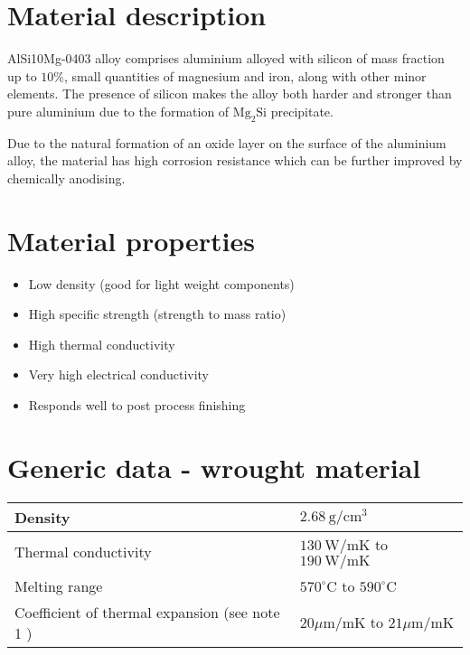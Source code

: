 \documentclass[10pt]{article}
\begin{document}
\section*{Material description}
AlSi10Mg-0403 alloy comprises aluminium alloyed with silicon of mass fraction up to $10 \%$, small quantities of magnesium and iron, along with other minor elements. The presence of silicon makes the alloy both harder and stronger than pure aluminium due to the formation of $\mathrm{Mg}_{2} \mathrm{Si}$ precipitate.

Due to the natural formation of an oxide layer on the surface of the aluminium alloy, the material has high corrosion resistance which can be further improved by chemically anodising.

\section*{Material properties}
\begin{itemize}
  \item Low density (good for light weight components)

  \item High specific strength (strength to mass ratio)

  \item High thermal conductivity

  \item Very high electrical conductivity

  \item Responds well to post process finishing

\end{itemize}

\section*{Generic data - wrought material}
\begin{center}
\begin{tabular}{|l|l|}
\hline
Density & $2.68 \mathrm{~g} / \mathrm{cm}^{3}$ \\
\hline
Thermal conductivity & $130 \mathrm{~W} / \mathrm{mK}$ to $190 \mathrm{~W} / \mathrm{mK}$ \\
\hline
Melting range & $570^{\circ} \mathrm{C}$ to $590^{\circ} \mathrm{C}$ \\
\hline
Coefficient of thermal expansion (see note 1 ) & $20 \mu \mathrm{m} / \mathrm{mK}$ to $21 \mu \mathrm{m} / \mathrm{mK}$ \\
\hline
\end{tabular}
\end{center}
\end{document}
